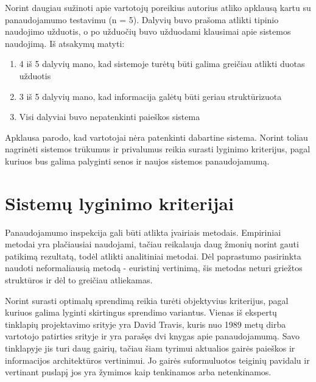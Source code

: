 \documentclass{VUMIFPSkursinis}
\begin{document}
Norint daugiau sužinoti apie vartotojų poreikius autorius atliko apklausą kartu su panaudojamumo testavimu (n = 5). Dalyvių buvo prašoma atlikti tipinio naudojimo užduotis, o po užduočių buvo užduodami klausimai apie sistemos naudojimą. Iš atsakymų matyti:
\begin{enumerate}
\item 4 iš 5 dalyvių mano, kad sistemoje turėtų būti galima greičiau atlikti duotas užduotis
\item 3 iš 5 dalyvių mano, kad informacija galėtų būti geriau struktūrizuota
\item Visi dalyviai buvo nepatenkinti paieškos sistema
\end{enumerate}

Apklausa parodo, kad vartotojai nėra patenkinti dabartine sistema. Norint toliau nagrinėti sistemos trūkumus ir privalumus reikia surasti lyginimo kriterijus, pagal kuriuos bus galima palyginti senos ir naujos sistemos panaudojamumą.



\section{Sistemų lyginimo kriterijai}
Panaudojamumo inspekcija gali būti atlikta įvairiais metodais. Empiriniai metodai yra plačiausiai naudojami\cite{NielsenUsabilityEn}, tačiau reikalauja daug žmonių norint gauti patikimą rezultatą, todėl atlikti analitiniai metodai. Dėl paprastumo pasirinkta naudoti neformaliausią metodą - euristinį vertinimą, šis metodas neturi griežtos struktūros ir dėl to greičiau atliekamas.

Norint surasti optimalų sprendimą reikia turėti objektyvius kriterijus, pagal kuriuos galima lyginti skirtingus sprendimo variantus. Vienas iš ekspertų tinklapių projektavimo srityje yra David Travis, kuris nuo 1989 metų dirba vartotojo patirties srityje ir yra parašęs dvi knygas apie panaudojamumą. Savo tinklapyje jis turi daug gairių, tačiau šiam tyrimui aktualios gairės paieškos ir informacijos architektūros vertinimui. Jo gairės suformuluotos teiginių pavidalu ir vertinant puslapį jos yra žymimos kaip tenkinamos arba netenkinamos\cite{SearchGuidelinesEn}\cite{NavigationAndIAGuidelinesEn}. 
\end{document}
